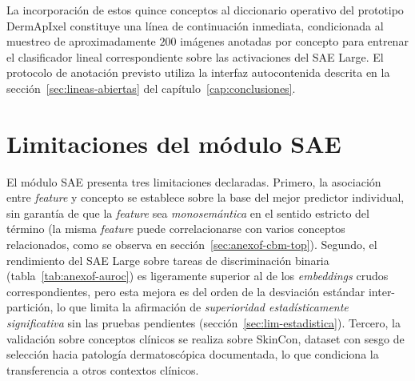 La incorporación de estos quince conceptos al diccionario operativo
del prototipo DermApIxel constituye una línea de continuación
inmediata, condicionada al muestreo de aproximadamente
$200$ imágenes anotadas por concepto para entrenar el
clasificador lineal correspondiente sobre las activaciones del SAE
Large. El protocolo de anotación previsto utiliza la interfaz
autocontenida descrita en la secci\'on~\ref{sec:lineas-abiertas} del
capítulo~\ref{cap:conclusiones}.

\section{Limitaciones del módulo SAE}
\label{sec:anexof-limitaciones}

El módulo SAE presenta tres limitaciones declaradas. Primero, la
asociación entre \emph{feature} y concepto se establece sobre la
base del mejor predictor individual, sin garantía de que la
\emph{feature} sea \emph{monosemántica} en el sentido estricto del
término (la misma \emph{feature} puede correlacionarse con varios
conceptos relacionados, como se observa en
secci\'on~\ref{sec:anexof-cbm-top}). Segundo, el rendimiento del SAE Large
sobre tareas de discriminación binaria
(tabla~\ref{tab:anexof-auroc}) es ligeramente superior al de los
\emph{embeddings} crudos correspondientes, pero esta mejora es del
orden de la desviación estándar inter-partición, lo que limita la
afirmación de \emph{superioridad estadísticamente significativa}
sin las pruebas pendientes (secci\'on~\ref{sec:lim-estadistica}).
Tercero, la validación sobre conceptos clínicos se realiza sobre
SkinCon, dataset con sesgo de selección hacia patología
dermatoscópica documentada, lo que condiciona la transferencia a
otros contextos clínicos.

